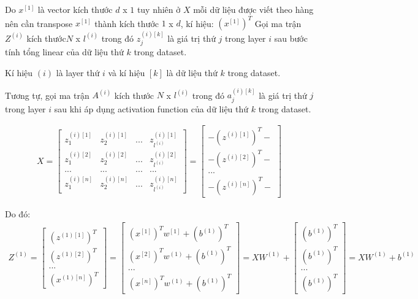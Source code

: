 Do $x^{[1]}$ là vector kích thước $d$ x $1$ tuy nhiên ở $X$ mỗi dữ liệu được viết theo hàng nên cần transpose $x^{[1]}$ thành kích thước $1$ x $d$, kí hiệu: $(x^{[1]})^T$
Gọi ma trận $Z^{(i)}$ kích thước$ N$ x $l^{(i)}$ trong đó $z_{j}^{(i)[k]}$ là giá trị thứ $j$ trong layer $i$ sau bước tính tổng linear của dữ liệu thứ $k$ trong dataset.

Kí hiệu $(i)$ là layer thứ $i$ và kí hiệu $[k]$ là dữ liệu thứ $k$ trong dataset.

Tương tự, gọi ma trận $A^{(i)}$ kích thước $N$ x $l^{(i)}$ trong đó $a_{j}^{(i)[k]}$ là giá trị thứ $j$ trong layer $i$ sau khi áp dụng activation function của dữ liệu thứ $k$ trong dataset.

\begin{align}
 X = \begin{bmatrix}z_{1}^{(i)[1]}&z_{2}^{(i)[1]}&...&z_{l^{(i)}}^{(i)[1]}\\z_{1}^{(i)[2]}&z_{2}^{(i)[2]}&...&z_{l^{(i)}}^{(i)[2]}\\...&...&...&...\\z_{1}^{(i)[n]}&z_{2}^{(i)[n]}&...&z_{l^{(i)}}^{(i)[n]}\end{bmatrix} =  \begin{bmatrix}-(z^{(i)[1]})^{T}-\\-(z^{(i)[2]})^{T}-\\...\\-(z^{(i)[n]})^{T}-\end{bmatrix}
\end{align}

Do đó:
\begin{align}
Z^{(1)} = \begin{bmatrix}(z^{(1)[1]})^{T}\\(z^{(1)[2]})^{T}\\...\\(x^{(1)[n]})^{T}\end{bmatrix} 
= \begin{bmatrix}(x^{[1]})^{T}w^{[1]}+(b^{(1)})^{T}\\(x^{[2]})^{T}w^{(1)}+(b^{(1)})^{T}\\...\\(x^{[n]})^{T}w^{(1)}+(b^{(1)})^{T}\end{bmatrix}
= XW^{(1)}+\begin{bmatrix}(b^{(1)})^{T}\\(b^{(1)})^{T}\\...\\(b^{(1)})^{T}\end{bmatrix}
= XW^{(1)}+b^{(1)}
\end{align}


